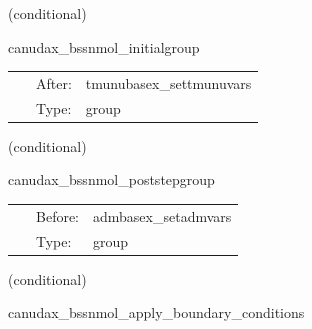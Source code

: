    (conditional) 

\hspace{5mm} canudax\_bssnmol\_initialgroup 

\hspace{5mm}{\it canudax\_bssnmol: initial bin } 


\hspace{5mm}

 \begin{tabular*}{160mm}{cll} 
~ & After:  & tmunubasex\_settmunuvars \\ 
~ & Type:  & group \\ 
\end{tabular*} 


\vspace{5mm}

   (conditional) 

\hspace{5mm} canudax\_bssnmol\_poststepgroup 

\hspace{5mm}{\it canudax\_bssnmol: post-step operations } 


\hspace{5mm}

 \begin{tabular*}{160mm}{cll} 
~ & Before:  & admbasex\_setadmvars \\ 
~ & Type:  & group \\ 
\end{tabular*} 


\vspace{5mm}

   (conditional) 

\hspace{5mm} canudax\_bssnmol\_apply\_boundary\_conditions 

\hspace{5mm}{\it apply radiative boundary conditions  } 


\hspace{5mm}


